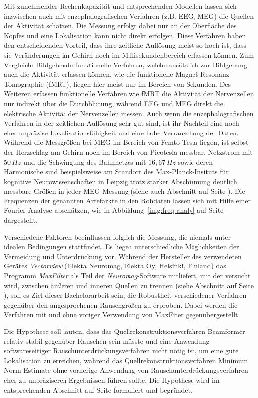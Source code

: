 \documentclass[doc,a4paper,12pt]{apa6}
\makeatletter
\DeclareRobustCommand*{\nameref}[1]{%
      \glqq{\myorg@nameref{#1}}\grqq%
    }%
\makeatother
\begin{document}
Mit zunehmender Rechenkapazität und entsprechenden Modellen lassen sich inzwischen auch mit enzephalografischen Verfahren (z.B. EEG, MEG) die Quellen der Aktivität schätzen. Die Messung erfolgt dabei nur an der Oberfläche des Kopfes und eine Lokalisation kann nicht direkt erfolgen. Diese Verfahren haben den entscheidenden Vorteil, dass ihre zeitliche Auflösung meist so hoch ist, dass sie Veränderungen im Gehirn noch im Millisekundenbereich erfassen können. Zum Vergleich: Bildgebende funktionelle Verfahren, welche zusätzlich zur Bildgebung auch die Aktivität erfassen können, wie die funktionelle Magnet-Resonanz-Tomographie (fMRT), liegen hier meist nur im Bereich von Sekunden. Des Weiteren erfassen funktionelle Verfahren wie fMRT die Aktivität der Nervenzellen nur indirekt über die Durchblutung, während EEG und MEG direkt die elektrische Aktivität der Nervenzellen messen. Auch wenn die enzephalografischen Verfahren in der zeitlichen Auflösung sehr gut sind, ist ihr Nachteil eine noch eher unpräzise Lokalisationsfähigkeit und eine hohe Verrauschung der Daten. Während die Messgrößen bei MEG im Bereich von Femto-Tesla liegen, ist selbst der Herzschlag am Gehirn noch im Bereich von Picotesla messbar. Netzstrom mit $50\,Hz$ und die Schwingung des Bahnnetzes mit $16,67\,Hz$ sowie deren Harmonische sind beispielsweise am Standort des Max-Planck-Insituts für kognitive Neurowissenschaften in Leipzig trotz starker Abschirmung deutlich messbare Größen in jeder MEG-Messung (siehe auch Abschnitt \nameref{sec:rauschen} auf Seite \pageref{sec:rauschen}). Die Frequenzen der genannten Artefarkte in den Rohdaten lassen sich mit Hilfe einer Fourier-Analyse abschätzen, wie in Abbildung~\ref{img:freq-analy} auf Seite~\pageref{img:freq-analy} dargestellt.

Verschiedene Faktoren beeinflussen folglich die Messung, die niemals unter idealen Bedingungen stattfindet. Es liegen unterschiedliche Möglichkeiten der Vermeidung und Unterdrückung vor. Während der Hersteller des verwendeten Gerätes \emph{Vectorview} (Elekta Neuromag, Elekta Oy, Helsinki, Finland) das Programm \emph{MaxFilter} als Teil der \emph{Neuromag}-Software mitliefert, mit der versucht wird, zwischen äußeren und inneren Quellen zu trennen (siehe Abschnitt \nameref{sec:maxfilter} auf Seite \pageref{sec:maxfilter}), soll es Ziel dieser Bachelorarbeit sein, die Robustheit verschiedener Verfahren gegenüber den angesprochenen Rauschgrößen zu erproben. Dabei werden die Verfahren mit und ohne voriger Verwendung von MaxFiter gegenübergestellt.

Die Hypothese soll lauten, dass das Quellrekonstruktionsverfahren Beamformer relativ stabil gegenüber Rauschen sein müsste und eine Anwendung softwareseitiger Rauschunterdrückungsverfahren nicht nötig ist, um eine gute Lokalisation zu erreichen, während das Quellrekonstruktionsverfahren Minimum Norm Estimate ohne vorherige Anwendung von Rauschunterdrückungsverfahren eher zu unpräziseren Ergebnissen führen sollte. Die Hypothese wird im entsprechenden Abschnitt auf Seite \pageref{sec:hypo} formuliert und begründet.
\end{document}
